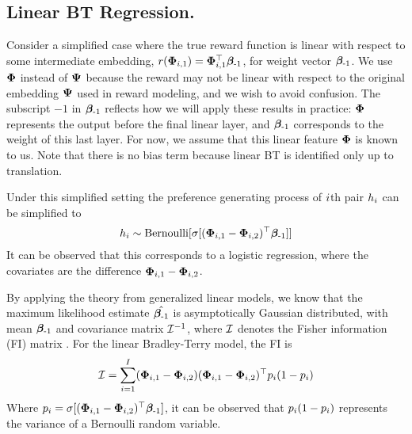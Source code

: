 
\subsection{Linear BT Regression.}
Consider a simplified case where the true reward function is linear with respect to some intermediate embedding, $r(\bm{\Phi}_{i,1}) = \bm{\Phi}_{i,1}^\top \bm{\beta}_{\text{-1}}$, for weight vector $\bm{\beta}_{\text{-1}}$. We use $\bm{\Phi}$ instead of $\bm{\Psi}$ because the reward may not be linear with respect to the original embedding $\bm{\Psi}$ used in reward modeling, and we wish to avoid confusion. The subscript $-1$ in $\bm{\beta}_{\text{-1}}$ reflects how we will apply these results in practice: $\bm{\Phi}$ represents the output before the final linear layer, and $\bm{\beta}_{\text{-1}}$ corresponds to the weight of this last layer. For now, we assume that this linear feature $\bm{\Phi}$ is known to us. Note that there is no bias term because linear BT is identified only up to translation. 

Under this simplified setting the preference generating process of $i$th pair $h_{i}$ can be simplified to 
\begin{equation}
    h_{i} \sim \operatorname{Bernoulli}[\sigma[(\bm{\Phi}_{i,1}-\bm{\Phi}_{i,2})^\top\bm{\beta}_{\text{-1}}]]
    \label{eq:BT}
\end{equation}
It can be observed that this corresponds to a logistic regression, where the covariates are the difference $\bm{\Phi}_{i,1} - \bm{\Phi}_{i,2}$.

By applying the theory from generalized linear models, we know that the maximum likelihood estimate $\hat{\bm{\beta}_{\text{-1}}}$ is asymptotically Gaussian distributed, with mean $\bm{\beta}_{\text{-1}}$ and covariance matrix $\mathcal{I}^{-1}$, where $\mathcal{I}$ denotes the Fisher information (FI) matrix \citep[see e.g., ][Ch. 4.5.2]{shao2008mathematical}. For the linear Bradley-Terry model, the FI is
\begin{equation}
    \mathcal{I}=\sum_{i=1}^I (\bm{\Phi}_{i,1}-\bm{\Phi}_{i,2})(\bm{\Phi}_{i,1}-\bm{\Phi}_{i,2})^\top p_{i}(1-p_{i})
    \label{eq:FI}
\end{equation}
Where $p_{i} = \sigma[(\bm{\Phi}_{i,1} - \bm{\Phi}_{i,2})^\top \bm{\beta}_{\text{-1}}]$, it can be observed that $p_{i}(1 - p_{i})$ represents the variance of a Bernoulli random variable.

